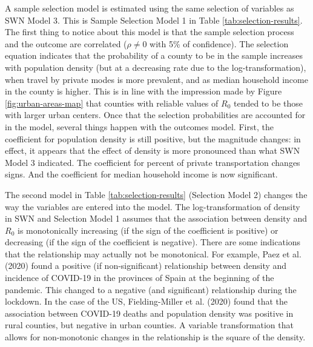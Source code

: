 \documentclass[]{elsarticle} %
\begin{document}
A sample selection model is estimated using the same selection of
variables as SWN Model 3. This is Sample Selection Model 1 in Table
\ref{tab:selection-results}. The first thing to notice about this model
is that the sample selection process and the outcome are correlated
(\(\rho\ne0\) with 5\% of confidence). The selection equation indicates
that the probability of a county to be in the sample increases with
population density (but at a decreasing rate due to the
log-transformation), when travel by private modes is more prevalent, and
as median household income in the county is higher. This is in line with
the impression made by Figure \ref{fig:urban-areas-map} that counties
with reliable values of \(R_0\) tended to be those with larger urban
centers. Once that the selection probabilities are accounted for in the
model, several things happen with the outcomes model. First, the
coefficient for population density is still positive, but the magnitude
changes: in effect, it appears that the effect of density is more
pronounced than what SWN Model 3 indicated. The coefficient for percent
of private transportation changes signs. And the coefficient for median
household income is now significant.

The second model in Table \ref{tab:selection-results} (Selection Model
2) changes the way the variables are entered into the model. The
log-transformation of density in SWN and Selection Model 1 assumes that
the association between density and \(R_0\) is monotonically increasing
(if the sign of the coefficient is positive) or decreasing (if the sign
of the coefficient is negative). There are some indications that the
relationship may actually not be monotonical. For example, Paez et al.
(2020) found a positive (if non-significant) relationship between
density and incidence of COVID-19 in the provinces of Spain at the
beginning of the pandemic. This changed to a negative (and significant)
relationship during the lockdown. In the case of the US, Fielding-Miller
et al. (2020) found that the association between COVID-19 deaths and
population density was positive in rural counties, but negative in urban
counties. A variable transformation that allows for non-monotonic
changes in the relationship is the square of the density.
\end{document}
